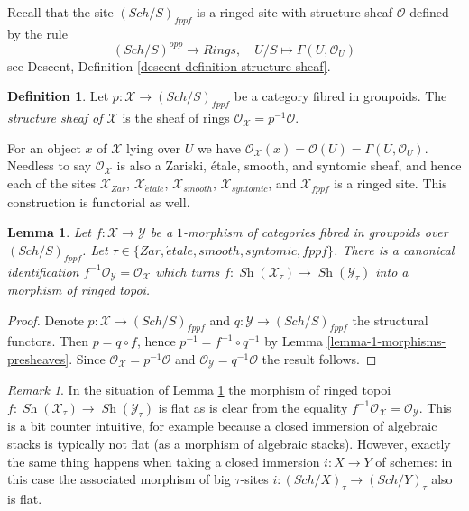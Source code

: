 \documentclass{stacks-project}
\theoremstyle{plain}
\newtheorem{lemma}[subsection]{Lemma}
\theoremstyle{definition}
\newtheorem{definition}[subsection]{Definition}
\theoremstyle{remark}
\newtheorem{remark}[subsection]{Remark}
\numberwithin{equation}{subsection}
\def\Sch{\mathit{Sch}}
\def\Sh{\mathop{\mathit{Sh}}\nolimits}
\def\etale{{\acute{e}tale}}
\begin{document}
\medskip\noindent
Recall that the site $(\Sch/S)_{fppf}$ is a ringed site
with structure sheaf $\mathcal{O}$ defined by the rule
$$
(\Sch/S)^{opp} \longrightarrow \textit{Rings},
\quad
U/S \longmapsto \Gamma(U, \mathcal{O}_U)
$$
see
Descent, Definition \ref{descent-definition-structure-sheaf}.

\begin{definition}
\label{definition-structure-sheaf}
Let $p : \mathcal{X} \to (\Sch/S)_{fppf}$ be a category
fibred in groupoids. The
{\it structure sheaf of $\mathcal{X}$} is the sheaf of rings
$\mathcal{O}_\mathcal{X} = p^{-1}\mathcal{O}$.
\end{definition}

\noindent
For an object $x$ of $\mathcal{X}$ lying over $U$ we have
$\mathcal{O}_\mathcal{X}(x) = \mathcal{O}(U) = \Gamma(U, \mathcal{O}_U)$.
Needless to say $\mathcal{O}_\mathcal{X}$ is also a Zariski, \'etale,
smooth, and syntomic sheaf, and hence each of the sites
$\mathcal{X}_{Zar}$, $\mathcal{X}_\etale$, $\mathcal{X}_{smooth}$,
$\mathcal{X}_{syntomic}$, and $\mathcal{X}_{fppf}$ is a ringed site.
This construction is functorial as well.

\begin{lemma}
\label{lemma-functoriality-structure-sheaf}
Let $f : \mathcal{X} \to \mathcal{Y}$ be a $1$-morphism of categories
fibred in groupoids over $(\Sch/S)_{fppf}$. Let
$\tau \in \{Zar, \etale, smooth, syntomic, fppf\}$.
There is a canonical identification
$f^{-1}\mathcal{O}_\mathcal{Y} = \mathcal{O}_\mathcal{X}$
which turns
$f : \Sh(\mathcal{X}_\tau) \to \Sh(\mathcal{Y}_\tau)$
into a morphism of ringed topoi.
\end{lemma}

\begin{proof}
Denote $p : \mathcal{X} \to (\Sch/S)_{fppf}$ and
$q : \mathcal{Y} \to (\Sch/S)_{fppf}$ the structural functors.
Then $p = q \circ f$, hence $p^{-1} = f^{-1} \circ q^{-1}$ by
Lemma \ref{lemma-1-morphisms-presheaves}. Since
$\mathcal{O}_\mathcal{X} = p^{-1}\mathcal{O}$ and
$\mathcal{O}_\mathcal{Y} = q^{-1}\mathcal{O}$
the result follows.
\end{proof}

\begin{remark}
\label{remark-flat}
In the situation of
Lemma \ref{lemma-functoriality-structure-sheaf}
the morphism of ringed topoi
$f : \Sh(\mathcal{X}_\tau) \to \Sh(\mathcal{Y}_\tau)$
is flat as is clear from the equality
$f^{-1}\mathcal{O}_\mathcal{X} = \mathcal{O}_\mathcal{Y}$.
This is a bit counter intuitive, for example because a closed
immersion of algebraic stacks is typically not flat (as a morphism of
algebraic stacks).
However, exactly the same thing happens when taking a closed
immersion $i : X \to Y$ of schemes: in this case the associated
morphism of big $\tau$-sites
$i : (\Sch/X)_\tau \to (\Sch/Y)_\tau$
also is flat.
\end{remark}
\end{document}
